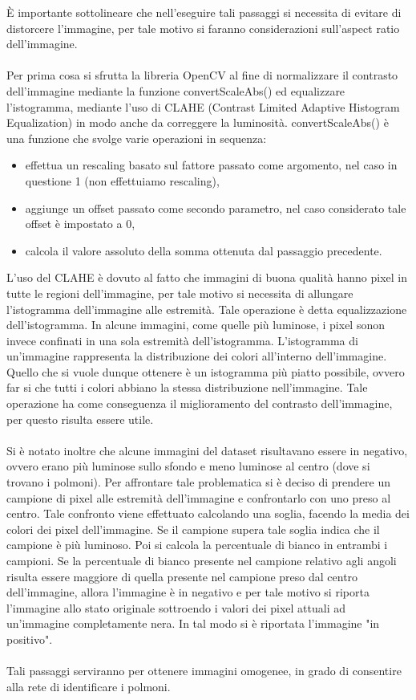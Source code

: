 È importante sottolineare che nell'eseguire tali passaggi si necessita di evitare di distorcere l'immagine, per tale 
motivo si faranno considerazioni sull'aspect ratio dell'immagine.
\\\\
Per prima cosa si sfrutta la libreria OpenCV \cite{ocv} al fine di normalizzare il contrasto dell'immagine mediante la funzione convertScaleAbs() ed 
equalizzare l'istogramma, mediante l'uso di CLAHE (Contrast Limited Adaptive Histogram Equalization) in modo anche da correggere la luminosità.
convertScaleAbs() è una funzione che svolge varie operazioni in sequenza:
\begin{itemize}
    \item effettua un rescaling basato sul fattore passato come argomento, nel caso in questione 1 (non effettuiamo rescaling),
    \item aggiunge un offset passato come secondo parametro, nel caso considerato tale offset è impostato a 0,
    \item calcola il valore assoluto della somma ottenuta dal passaggio precedente.
\end{itemize}
L'uso del CLAHE è dovuto al fatto che immagini di buona qualità hanno pixel in tutte le regioni dell'immagine, per tale motivo si necessita di 
allungare l'istogramma dell'immagine alle estremità. Tale operazione è detta equalizzazione dell'istogramma. In alcune immagini, come quelle più luminose, 
i pixel sonon invece confinati in una sola estremità dell'istogramma. L'istogramma di un'immagine rappresenta la distribuzione dei colori all'interno dell'immagine.
Quello che si vuole dunque ottenere è un istogramma più piatto possibile, ovvero far si che tutti i colori abbiano la stessa distribuzione nell'immagine.
Tale operazione ha come conseguenza il miglioramento del contrasto dell'immagine, per questo risulta essere utile.
\\\\
Si è notato inoltre che alcune immagini del dataset risultavano essere in negativo, ovvero erano più luminose sullo sfondo e meno luminose al centro (dove si trovano i polmoni).
Per affrontare tale problematica si è deciso di prendere un campione di pixel alle estremità dell'immagine e confrontarlo con uno preso al centro.
Tale confronto viene effettuato calcolando una soglia, facendo la media dei colori dei pixel dell'immagine.
Se il campione supera tale soglia indica che il campione è più luminoso. Poi si calcola la percentuale di bianco in entrambi i campioni. 
Se la percentuale di bianco presente nel campione relativo agli angoli risulta essere maggiore di quella presente nel campione preso dal centro dell'immagine, allora 
l'immagine è in negativo e per tale motivo si riporta l'immagine allo stato originale sottroendo  i valori dei pixel attuali ad un'immagine completamente nera.
In tal modo si è riportata l'immagine "in positivo".
\\\\
Tali passaggi serviranno per ottenere immagini omogenee, in grado di consentire alla rete di identificare i polmoni.

